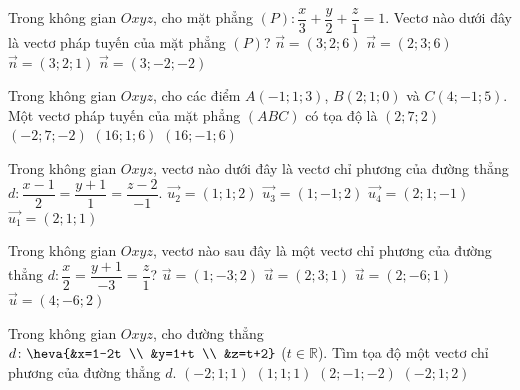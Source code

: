 \begin{ex}%
	Trong không gian $Oxyz$, cho mặt phẳng $(P) \colon \dfrac{x}{3}+\dfrac{y}{2}+\dfrac{z}{1}=1$. Vectơ nào dưới đây là vectơ pháp tuyến của mặt phẳng $(P)$?
	\choice
	{$\overrightarrow{n}=(3;2;6)$}
	{\True $\overrightarrow{n}=(2;3;6)$}
	{$\overrightarrow{n}=(3;2;1)$}
	{$\overrightarrow{n}=(3;-2;-2)$}
\end{ex}

\begin{ex}%
	Trong không gian $Oxyz$, cho các điểm $A(-1;1;3)$, $B(2;1;0)$ và $C(4;-1;5)$. Một vectơ pháp tuyến của mặt phẳng $(ABC)$ có tọa độ là
	\choice
	{\True $(2;7;2)$}
	{$(-2;7;-2)$}
	{$(16;1;6)$}
	{$(16;-1;6)$}
\end{ex}

\begin{ex}%
		Trong không gian $Oxyz$, vectơ nào dưới đây là vectơ chỉ phương của đường thẳng $d \colon \dfrac{x-1}{2}=\dfrac{y+1}{1}=\dfrac{z-2}{-1}$.
	\choice
	{$\overrightarrow{u_2}=(1;1;2)$}
	{$\overrightarrow{u_3}=(1;-1;2)$}
	{\True $\overrightarrow{u_4}=(2;1;-1)$}
	{$\overrightarrow{u_1}=(2;1;1)$}
\end{ex}

\begin{ex}%
	Trong không gian $Oxyz$, vectơ nào sau đây là một vectơ chỉ phương của đường thẳng $d \colon \dfrac{x}{2}=\dfrac{y+1}{-3}=\dfrac{z}{1}$?
	\choice
	{$\overrightarrow{u}=(1;-3;2)$}
	{$\overrightarrow{u}=(2;3;1)$}
	{$\overrightarrow{u}=(2;-6;1)$}
	{\True $\overrightarrow{u}=(4;-6;2)$}
\end{ex}

\begin{ex}%
	Trong không gian $Oxyz$, cho đường thẳng $d \colon \heva{&x=1-2t \\ &y=1+t \\ &z=t+2}$ ($t\in \mathbb{R}$). Tìm tọa độ một vectơ chỉ phương của đường thẳng $d$.
	\choice
	{\True $(-2;1;1)$}
	{$(1;1;1)$}
	{$(2;-1;-2)$}
	{$(-2;1;2)$}
\end{ex}

